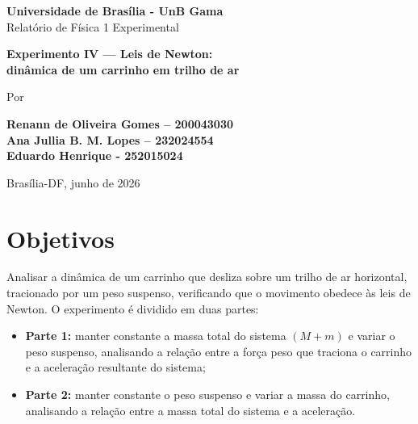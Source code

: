 \documentclass[12pt,a4paper]{article}
\begin{document}
\begin{titlepage}

\begin{center}

\large{\textbf{Universidade de Brasília - UnB Gama}}\\[1cm]



{\large Relatório de Física 1 Experimental}

\vspace{2.3cm}
{\large }
\vspace{2.6cm}



{\LARGE \bf  Experimento IV --- Leis de Newton:\\ dinâmica de um carrinho em trilho de ar} \vspace{2cm}

Por
%
\vspace{2cm}

{\bf	Renann de Oliveira Gomes – 200043030 \\
		Ana Jullia B. M. Lopes – 232024554 \\
		Eduardo Henrique - 252015024 \\}



%
\vspace*{\fill}

%
{Brasília-DF, junho de 2026}


\end{center}
\end{titlepage}




\newpage


\section{Objetivos}
Analisar a dinâmica de um carrinho que desliza sobre um trilho de ar horizontal, tracionado
por um peso suspenso, verificando que o movimento obedece às leis de Newton. O experimento é
dividido em duas partes:
\begin{itemize}
	\item \textbf{Parte 1:} manter constante a massa total do sistema $(M+m)$ e variar o peso
	suspenso, analisando a relação entre a força peso que traciona o carrinho e a aceleração
	resultante do sistema;
	\item \textbf{Parte 2:} manter constante o peso suspenso e variar a massa do carrinho,
	analisando a relação entre a massa total do sistema e a aceleração.
\end{itemize}
\end{document}
